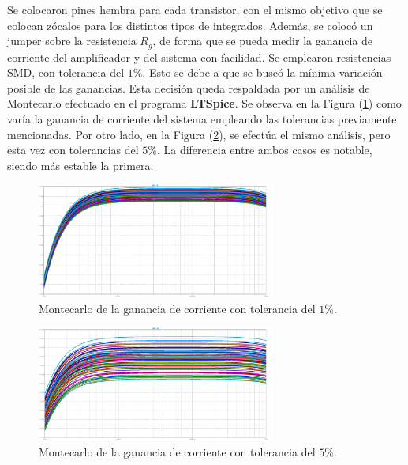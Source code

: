 Se colocaron pines hembra para cada transistor, con el mismo objetivo que se colocan zócalos para los distintos tipos de integrados. Además, se colocó un jumper sobre la resistencia $R_g$, de forma que se pueda medir la ganancia de corriente del amplificador y del sistema  con facilidad. Se emplearon resistencias SMD, con tolerancia del $1\%$. Esto se debe a que se buscó la mínima variación posible de las ganancias. Esta decisión queda respaldada por un análisis de Montecarlo efectuado en el programa \textbf{LTSpice}. Se observa en la Figura (\ref{fig:mc-ai1}) como varía la ganancia de corriente del sistema empleando las tolerancias previamente mencionadas. Por otro lado, en la Figura (\ref{fig:mc-ai2}), se efectúa el mismo análisis, pero esta vez con tolerancias del $5\%$. La diferencia entre ambos casos es notable, siendo más estable la primera.
\begin{figure}[H]
\centering
	\includegraphics[width=0.7\textwidth]{Imagenes/MC-Ai.png}
	\caption{Montecarlo de la ganancia de corriente con tolerancia del $1\%$.}
	\label{fig:mc-ai1}
\end{figure}
\begin{figure}[H]
\centering
	\includegraphics[width=0.7\textwidth]{Imagenes/MC-Ai_2.png}
	\caption{Montecarlo de la ganancia de corriente con tolerancia del $5\%$.}
	\label{fig:mc-ai2}
\end{figure}

\newpage

